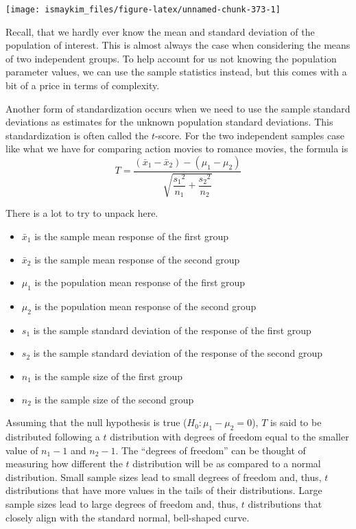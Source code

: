 \documentclass[12pt, krantz2,]{krantz}
\providecommand{\tightlist}{%
  \setlength{\itemsep}{0pt}\setlength{\parskip}{0pt}}
\begin{document}
\begin{center}\texttt{[image: ismaykim\_files/figure-latex/unnamed-chunk-373-1]} \end{center}

Recall, that we hardly ever know the mean and standard deviation of the population of interest. This is almost always the case when considering the means of two independent groups. To help account for us not knowing the population parameter values, we can use the sample statistics instead, but this comes with a bit of a price in terms of complexity.

Another form of standardization occurs when we need to use the sample standard deviations as estimates for the unknown population standard deviations. This standardization is often called the \(t\)-score. For the two independent samples case like what we have for comparing action movies to romance movies, the formula is \[T =\dfrac{ (\bar{x}_1 - \bar{x}_2) - (\mu_1 - \mu_2)}{ \sqrt{\dfrac{{s_1}^2}{n_1} + \dfrac{{s_2}^2}{n_2}}  }\]

There is a lot to try to unpack here.

\begin{itemize}
\tightlist
\item
  \(\bar{x}_1\) is the sample mean response of the first group
\item
  \(\bar{x}_2\) is the sample mean response of the second group
\item
  \(\mu_1\) is the population mean response of the first group
\item
  \(\mu_2\) is the population mean response of the second group
\item
  \(s_1\) is the sample standard deviation of the response of the first group
\item
  \(s_2\) is the sample standard deviation of the response of the second group
\item
  \(n_1\) is the sample size of the first group
\item
  \(n_2\) is the sample size of the second group
\end{itemize}

Assuming that the null hypothesis is true (\(H_0: \mu_1 - \mu_2 = 0\)), \(T\) is said to be distributed following a \(t\) distribution with degrees of freedom equal to the smaller value of \(n_1 - 1\) and \(n_2 - 1\). The ``degrees of freedom'' can be thought of measuring how different the \(t\) distribution will be as compared to a normal distribution. Small sample sizes lead to small degrees of freedom and, thus, \(t\) distributions that have more values in the tails of their distributions. Large sample sizes lead to large degrees of freedom and, thus, \(t\) distributions that closely align with the standard normal, bell-shaped curve.
\end{document}
